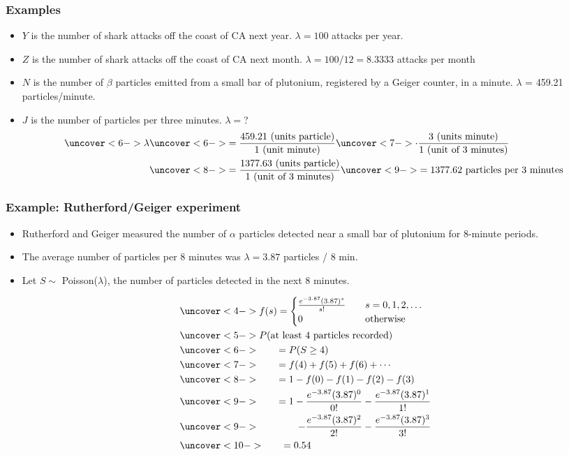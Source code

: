 \documentclass[handout]{beamer}\usepackage{graphicx, color}
\numberwithin{equation}{section}
\begin{document}
\begin{frame}
\frametitle{Examples} \small
\begin{itemize}
\pause \item $Y$ is the number of shark attacks off the coast of CA next year. $\lambda = 100$ attacks per year.
\pause \item $Z$ is the number of shark attacks off the coast of CA next month. $\lambda = 100/12 = 8.3333$ attacks per month
\pause \item $N$ is the number of $\beta$ particles emitted from a small bar of plutonium, registered by a Geiger counter, in a minute. $\lambda$ = 459.21 particles/minute.
\pause \item $J$ is the number of particles per three minutes. $\lambda = $?
\begin{align*}
\uncover<6->{\lambda} &\uncover<6->{= \frac{459.21 \text{ (units particle)}}{1 {\text{ (unit minute)}}}} \uncover<7->{\cdot \frac{3 {\text{ (units minute})}}{1 \text{ (unit of 3 minutes})}} \\
&\uncover<8->{= \frac{1377.63 \text{ (units particle)}}{1 \text{ (unit of 3 minutes)}}} \uncover<9->{= 1377.62 \text{ particles per 3 minutes}}
\end{align*}
\end{itemize}
\end{frame}

\begin{frame}
\frametitle{Example: Rutherford/Geiger experiment} \scriptsize
\begin{itemize}
\pause \item Rutherford and Geiger measured the number of $\alpha$ particles detected near a small bar of plutonium for 8-minute periods.
\pause \item The average number of particles per 8 minutes was $\lambda = 3.87$ particles / 8 min.
\pause \item Let $S \sim $ Poisson($\lambda$), the number of particles detected in the next 8 minutes. 
\end{itemize}
\begin{align*}
&\uncover<4->{f(s) = \begin{cases}
\frac{e^{-3.87}(3.87)^s}{s!} & \quad s = 0, 1, 2, \ldots \\
0 & \quad \text{otherwise}
\end{cases}} \\
&\uncover<5->{P(\text{at least 4 particles recorded})} \\
& \uncover<6->{\qquad = P(S \ge 4)} \\
& \uncover<7->{\qquad = f(4) + f(5) + f(6) + \cdots} \\
& \uncover<8->{\qquad = 1 - f(0) - f(1) - f(2) - f(3)} \\
& \uncover<9->{\qquad = 1 - \frac{e^{-3.87}(3.87)^0}{0!}  - \frac{e^{-3.87}(3.87)^1}{1!}} \\
& \uncover<9->{ \qquad \qquad  - \frac{e^{-3.87}(3.87)^2}{2!} - \frac{e^{-3.87}(3.87)^3}{3!}} \\
& \uncover<10->{\qquad = 0.54}
\end{align*}
\end{frame}
\end{document}
